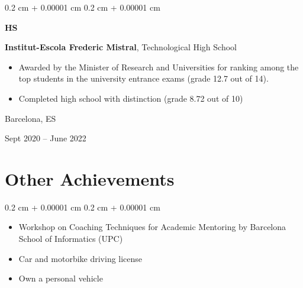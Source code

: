 \documentclass[10pt, letterpaper]{article}
\newenvironment{highlights}{
    \begin{itemize}[
        topsep=0.10 cm,
        parsep=0.10 cm,
        partopsep=0pt,
        itemsep=0pt,
        leftmargin=0.4 cm + 10pt
    ]
}{
    \end{itemize}
} %
\newenvironment{highlightsforbulletentries}{
    \begin{itemize}[
        topsep=0.10 cm,
        parsep=0.10 cm,
        partopsep=0pt,
        itemsep=0pt,
        leftmargin=10pt
    ]
}{
    \end{itemize}
} %
\newenvironment{onecolentry}{
    \begin{adjustwidth}{
        0.2 cm + 0.00001 cm
    }{
        0.2 cm + 0.00001 cm
    }
}{
    \end{adjustwidth}
} %
\newenvironment{twocolentry}[2][]{
    \onecolentry
    \def\secondColumn{#2}
    \setcolumnwidth{\fill, 4.5 cm}
    \begin{paracol}{2}
}{
    \switchcolumn \raggedleft \secondColumn
    \end{paracol}
    \endonecolentry
} %
\newenvironment{threecolentry}[3][]{
    \onecolentry
    \def\thirdColumn{#3}
    \setcolumnwidth{1 cm, \fill, 4.5 cm}
    \begin{paracol}{3}
    {\raggedright #2} \switchcolumn
}{
    \switchcolumn \raggedleft \thirdColumn
    \end{paracol}
    \endonecolentry
} %
\begin{document}
        \vspace{0.2 cm}

        \begin{threecolentry}{\textbf{HS}}{
            Barcelona, ES
            
            Sept 2020 – June 2022
        }
            \textbf{Institut-Escola Frederic Mistral}, Technological High School
            \begin{highlights}
                \item Awarded by the Minister of Research and Universities for ranking among the top students in the university entrance exams (grade 12.7 out of 14).
                \item Completed high school with distinction (grade 8.72 out of 10)
            \end{highlights}
        \end{threecolentry}
        
    
    \section{Other Achievements}
        \begin{onecolentry}
            \begin{highlightsforbulletentries}
                \item Workshop on Coaching Techniques for Academic Mentoring by Barcelona School of Informatics (UPC)
                \item Car and motorbike driving license
                \item Own a personal vehicle
            \end{highlightsforbulletentries}
        \end{onecolentry}



    



\end{document}
